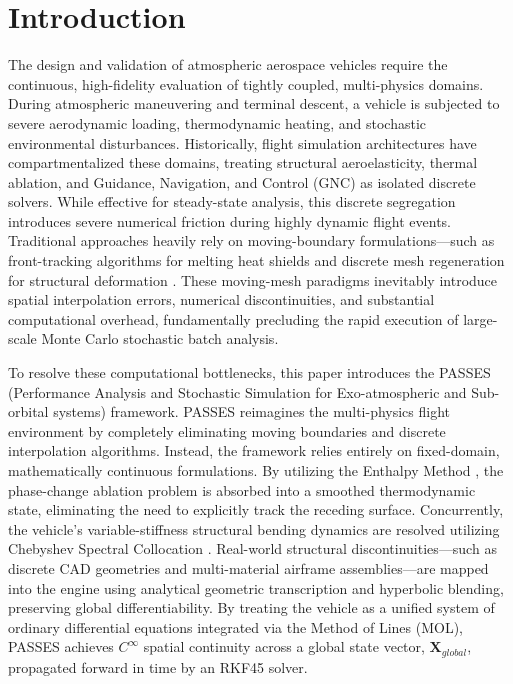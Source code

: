 \documentclass[11pt,a4paper]{article}
\theoremstyle{definition}
\numberwithin{equation}{section}
\begin{document}
\pagebreak

\section{Introduction}
\label{sec:intro}
The design and validation of atmospheric aerospace vehicles require the continuous, high-fidelity evaluation of tightly coupled, multi-physics domains. During atmospheric maneuvering and terminal descent, a vehicle is subjected to severe aerodynamic loading, thermodynamic heating, and stochastic environmental disturbances. Historically, flight simulation architectures have compartmentalized these domains, treating structural aeroelasticity, thermal ablation, and Guidance, Navigation, and Control (GNC) as isolated discrete solvers. While effective for steady-state analysis, this discrete segregation introduces severe numerical friction during highly dynamic flight events. Traditional approaches heavily rely on moving-boundary formulations—such as front-tracking algorithms for melting heat shields \cite{crank1984} and discrete mesh regeneration for structural deformation \cite{shyy1996}. These moving-mesh paradigms inevitably introduce spatial interpolation errors, numerical discontinuities, and substantial computational overhead, fundamentally precluding the rapid execution of large-scale Monte Carlo stochastic batch analysis.

To resolve these computational bottlenecks, this paper introduces the PASSES (Performance Analysis and Stochastic Simulation for Exo-atmospheric and Sub-orbital systems) framework. PASSES reimagines the multi-physics flight environment by completely eliminating moving boundaries and discrete interpolation algorithms. Instead, the framework relies entirely on fixed-domain, mathematically continuous formulations. By utilizing the Enthalpy Method \cite{voller1981}, the phase-change ablation problem is absorbed into a smoothed thermodynamic state, eliminating the need to explicitly track the receding surface. Concurrently, the vehicle's variable-stiffness structural bending dynamics are resolved utilizing Chebyshev Spectral Collocation \cite{trefethen2000}. Real-world structural discontinuities—such as discrete CAD geometries and multi-material airframe assemblies—are mapped into the engine using analytical geometric transcription and hyperbolic blending, preserving global differentiability. By treating the vehicle as a unified system of ordinary differential equations integrated via the Method of Lines (MOL), PASSES achieves $C^\infty$ spatial continuity across a global state vector, $\mathbf{X}_{global}$, propagated forward in time by an RKF45 solver.
\end{document}
